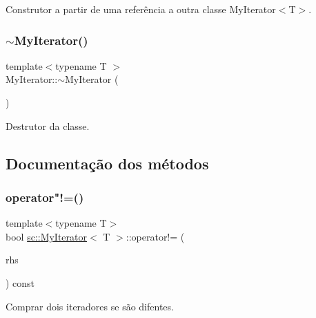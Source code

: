 Construtor a partir de uma referência a outra classe My\+Iterator$<$\+T$>$. 

\mbox{\label{classsc_1_1MyIterator_ae61c838df11b715349ffd198bc85e50f}} 
\subsubsection{\texorpdfstring{$\sim$\+My\+Iterator()}{~MyIterator()}}
{\footnotesize\ttfamily template$<$typename T $>$ \\
My\+Iterator\+::$\sim$\+My\+Iterator (\begin{DoxyParamCaption}{ }\end{DoxyParamCaption})\hspace{0.3cm}{\ttfamily [default]}}



Destrutor da classe. 



\subsection{Documentação dos métodos}
\mbox{\label{classsc_1_1MyIterator_a6a64ad5515a5111089f73871a140e48c}} 
\subsubsection{\texorpdfstring{operator"!=()}{operator!=()}}
{\footnotesize\ttfamily template$<$typename T$>$ \\
bool \hyperlink{classsc_1_1MyIterator}{sc\+::\+My\+Iterator}$<$ T $>$\+::operator!= (\begin{DoxyParamCaption}\item[{const \hyperlink{classsc_1_1MyIterator}{My\+Iterator}$<$ T $>$ \&}]{rhs }\end{DoxyParamCaption}) const}



Comprar dois iteradores se são difentes. 

\mbox{\label{classsc_1_1MyIterator_ae655a959eee3b7ed2bc9a897c537810a}} 
